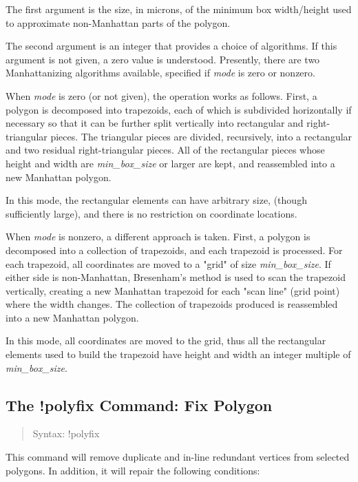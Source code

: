 The first argument is the size, in microns, of the minimum box
width/height used to approximate non-Manhattan parts of the polygon.

The second argument is an integer that provides a choice of
algorithms.  If this argument is not given, a zero value is
understood.  Presently, there are two Manhattanizing algorithms
available, specified if {\it mode} is zero or nonzero.

When {\it mode} is zero (or not given), the operation works as
follows.  First, a polygon is decomposed into trapezoids, each of
which is subdivided horizontally if necessary so that it can be
further split vertically into rectangular and right-triangular pieces. 
The triangular pieces are divided, recursively, into a rectangular and
two residual right-triangular pieces.  All of the rectangular pieces
whose height and width are {\it min\_box\_size} or larger are kept,
and reassembled into a new Manhattan polygon.

In this mode, the rectangular elements can have arbitrary size,
(though sufficiently large), and there is no restriction on coordinate
locations.

When {\it mode} is nonzero, a different approach is taken.  First, a
polygon is decomposed into a collection of trapezoids, and each
trapezoid is processed.  For each trapezoid, all coordinates are moved
to a "grid" of size {\it min\_box\_size}.  If either side is
non-Manhattan, Bresenham's method is used to scan the trapezoid
vertically, creating a new Manhattan trapezoid for each "scan line"
(grid point) where the width changes.  The collection of trapezoids
produced is reassembled into a new Manhattan polygon.

In this mode, all coordinates are moved to the grid, thus all the
rectangular elements used to build the trapezoid have height and width
an integer multiple of {\it min\_box\_size}.

\subsection{The {\cb !polyfix} Command: Fix Polygon}
\begin{quote}
Syntax: {\vt !polyfix}
\end{quote}
This command will remove duplicate and in-line redundant vertices from
selected polygons.  In addition, it will repair the following
conditions:


